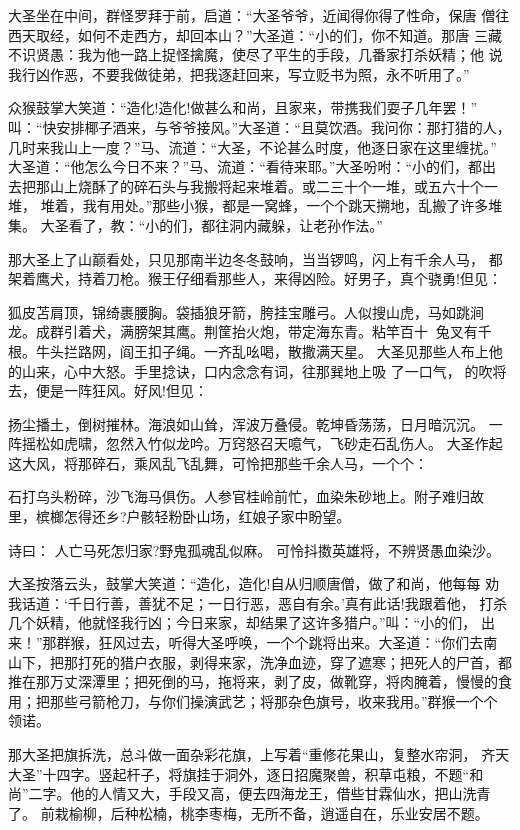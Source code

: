 大圣坐在中间，群怪罗拜于前，启道：“大圣爷爷，近闻得你得了性命，保唐
僧往西天取经，如何不走西方，却回本山？”大圣道：“小的们，你不知道。那唐
三藏不识贤愚：我为他一路上捉怪擒魔，使尽了平生的手段，几番家打杀妖精；他
说我行凶作恶，不要我做徒弟，把我逐赶回来，写立贬书为照，永不听用了。”

众猴鼓掌大笑道：“造化!造化!做甚么和尚，且家来，带携我们耍子几年罢！”
叫：“快安排椰子酒来，与爷爷接风。”大圣道：“且莫饮酒。我问你：那打猎的人，
几时来我山上一度？”马、流道：“大圣，不论甚么时度，他逐日家在这里缠扰。”
大圣道：“他怎么今日不来？”马、流道：“看待来耶。”大圣吩咐：“小的们，都出
去把那山上烧酥了的碎石头与我搬将起来堆着。或二三十个一堆，或五六十个一堆，
堆着，我有用处。”那些小猴，都是一窝蜂，一个个跳天搠地，乱搬了许多堆集。
大圣看了，教：“小的们，都往洞内藏躲，让老孙作法。”

那大圣上了山巅看处，只见那南半边冬冬鼓响，当当锣鸣，闪上有千余人马，
都架着鹰犬，持着刀枪。猴王仔细看那些人，来得凶险。好男子，真个骁勇!但见：

狐皮苫肩顶，锦绮裹腰胸。袋插狼牙箭，胯挂宝雕弓。人似搜山虎，马如跳涧
龙。成群引着犬，满膀架其鹰。荆筐抬火炮，带定海东青。粘竿百十，兔叉有千
根。牛头拦路网，阎王扣子绳。一齐乱吆喝，散撒满天星。
大圣见那些人布上他的山来，心中大怒。手里捻诀，口内念念有词，往那巽地上吸
了一口气，的吹将去，便是一阵狂风。好风!但见：

扬尘播土，倒树摧林。海浪如山耸，浑波万叠侵。乾坤昏荡荡，日月暗沉沉。
一阵摇松如虎啸，忽然入竹似龙吟。万窍怒召天噫气，飞砂走石乱伤人。
大圣作起这大风，将那碎石，乘风乱飞乱舞，可怜把那些千余人马，一个个：

石打乌头粉碎，沙飞海马俱伤。人参官桂岭前忙，血染朱砂地上。附子难归故
里，槟榔怎得还乡?户骸轻粉卧山场，红娘子家中盼望。

诗曰：
人亡马死怎归家?野鬼孤魂乱似麻。
可怜抖擞英雄将，不辨贤愚血染沙。

大圣按落云头，鼓掌大笑道：“造化，造化!自从归顺唐僧，做了和尚，他每每
劝我话道：‘千日行善，善犹不足；一日行恶，恶自有余。’真有此话!我跟着他，
打杀几个妖精，他就怪我行凶；今日来家，却结果了这许多猎户。”叫：“小的们，
出来！”那群猴，狂风过去，听得大圣呼唤，一个个跳将出来。大圣道：“你们去南
山下，把那打死的猎户衣服，剥得来家，洗净血迹，穿了遮寒；把死人的尸首，都
推在那万丈深潭里；把死倒的马，拖将来，剥了皮，做靴穿，将肉腌着，慢慢的食
用；把那些弓箭枪刀，与你们操演武艺；将那杂色旗号，收来我用。”群猴一个个
领诺。

那大圣把旗拆洗，总斗做一面杂彩花旗，上写着“重修花果山，复整水帘洞，
齐天大圣”十四字。竖起杆子，将旗挂于洞外，逐日招魔聚兽，积草屯粮，不题“和
尚”二字。他的人情又大，手段又高，便去四海龙王，借些甘霖仙水，把山洗青了。
前栽榆柳，后种松楠，桃李枣梅，无所不备，逍遥自在，乐业安居不题。

